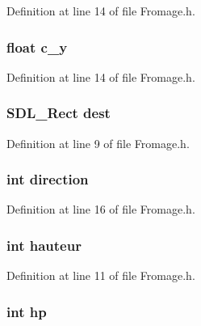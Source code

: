 Definition at line 14 of file Fromage.\-h.

\hypertarget{struct_fromage_a948ae6c4d8e4618590ebc2c1b13d0451}{
\subsubsection[{c\-\_\-y}]{\setlength{\rightskip}{0pt plus 5cm}float c\-\_\-y}}\label{struct_fromage_a948ae6c4d8e4618590ebc2c1b13d0451}


Definition at line 14 of file Fromage.\-h.

\hypertarget{struct_fromage_a1d4c1bb15892e31b9af1f4fcf5d31fab}{
\subsubsection[{dest}]{\setlength{\rightskip}{0pt plus 5cm}S\-D\-L\-\_\-\-Rect dest}}\label{struct_fromage_a1d4c1bb15892e31b9af1f4fcf5d31fab}


Definition at line 9 of file Fromage.\-h.

\hypertarget{struct_fromage_a886d551d5381dc3e53f17825ffc51641}{
\subsubsection[{direction}]{\setlength{\rightskip}{0pt plus 5cm}int direction}}\label{struct_fromage_a886d551d5381dc3e53f17825ffc51641}


Definition at line 16 of file Fromage.\-h.

\hypertarget{struct_fromage_a5e94a2f98c16e8b6860f95c99da1c0d3}{
\subsubsection[{hauteur}]{\setlength{\rightskip}{0pt plus 5cm}int hauteur}}\label{struct_fromage_a5e94a2f98c16e8b6860f95c99da1c0d3}


Definition at line 11 of file Fromage.\-h.

\hypertarget{struct_fromage_a9aa790f93d2d067a4f5608fdb8409f94}{
\subsubsection[{hp}]{\setlength{\rightskip}{0pt plus 5cm}int hp}}\label{struct_fromage_a9aa790f93d2d067a4f5608fdb8409f94}


